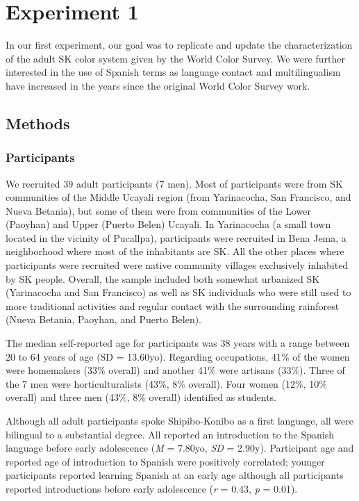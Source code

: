 \documentclass[
  english,
  ,man,floatsintext]{apa6}
\begin{document}
\hypertarget{experiment-1}{%
\section{Experiment 1}\label{experiment-1}}

In our first experiment, our goal was to replicate and update the characterization of the adult SK color system given by the World Color Survey. We were further interested in the use of Spanish terms as language contact and multilingualism have increased in the years since the original World Color Survey work.

\hypertarget{methods}{%
\subsection{Methods}\label{methods}}

\hypertarget{participants}{%
\subsubsection{Participants}\label{participants}}

We recruited 39 adult participants (7 men). Most of participants were from SK communities of the Middle Ucayali region (from Yarinacocha, San Francisco, and Nueva Betania), but some of them were from communities of the Lower (Paoyhan) and Upper (Puerto Belen) Ucayali. In Yarinacocha (a small town located in the vicinity of Pucallpa), participants were recruited in Bena Jema, a neighborhood where most of the inhabitants are SK. All the other places where participants were recruited were native community villages exclusively inhabited by SK people. Overall, the sample included both somewhat urbanized SK (Yarinacocha and San Francisco) as well as SK individuals who were still used to more traditional activities and regular contact with the surrounding rainforest (Nueva Betania, Paoyhan, and Puerto Belen).

The median self-reported age for participants was 38 years with a range between 20 to 64 years of age (SD = 13.60yo). Regarding occupations, 41\% of the women were homemakers (33\% overall) and another 41\% were artisans (33\%). Three of the 7 men were horticulturalists (43\%, 8\% overall). Four women (12\%, 10\% overall) and three men (43\%, 8\% overall) identified as students.

Although all adult participants spoke Shipibo-Konibo as a first language, all were bilingual to a substantial degree. All reported an introduction to the Spanish language before early adolescence (\emph{M} = 7.80yo, \emph{SD} = 2.90y). Participant age and reported age of introduction to Spanish were positively correlated; younger participants reported learning Spanish at an early age although all participants reported introductions before early adolescence (\emph{r} = 0.43, \emph{p} = 0.01).
\end{document}
